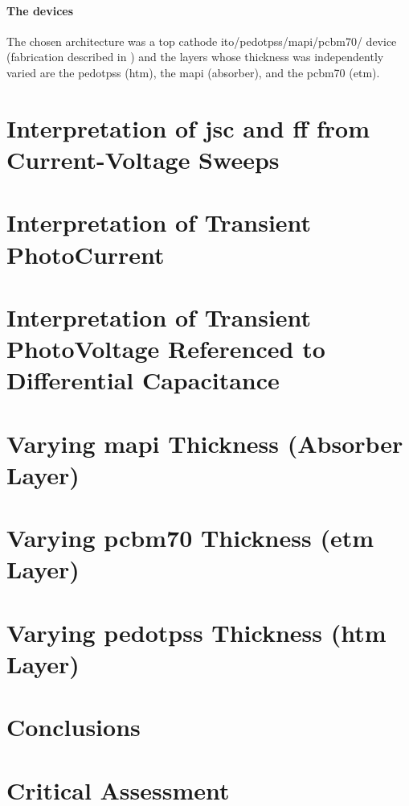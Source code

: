 	\paragraph{The devices} The chosen architecture was a top cathode \gls{ito}\-/\gls{pedotpss}\-/\gls{mapi}\-/\gls{pcbm70}\-/ device (fabrication described in ) and the layers whose thickness was independently varied are the \gls{pedotpss} (\gls{htm}), the \gls{mapi} (absorber), and the \gls{pcbm70} (\gls{etm}).

\section{Interpretation of \gls{jsc} and \gls{ff} from Current-Voltage Sweeps}

\section{Interpretation of Transient PhotoCurrent}\label{interpretation_tpc}

\section{Interpretation of Transient PhotoVoltage Referenced to Differential Capacitance}\label{interpretation_tpvdc}


\section{Varying \gls{mapi} Thickness (Absorber Layer)}


\section{Varying \gls{pcbm70} Thickness (\gls{etm} Layer)}
\section{Varying \gls{pedotpss} Thickness (\gls{htm} Layer)}
\section{Conclusions}
\section{Critical Assessment}